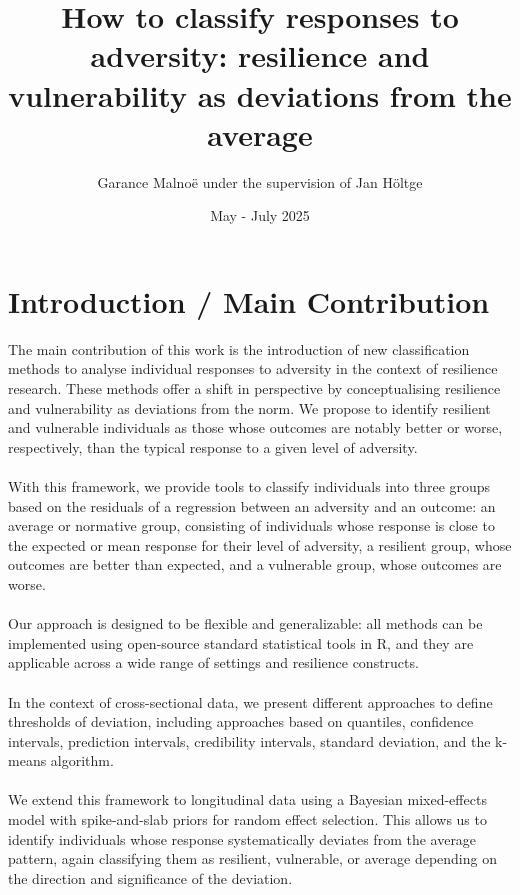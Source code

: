 \documentclass[12pt]{article}
\begin{document}
\title{How to classify responses to adversity: resilience and vulnerability as deviations from the average}
\author{Garance Malnoë under the supervision of Jan Höltge}
\date{May - July 2025}

\maketitle
\tableofcontents
\clearpage
{}
\section{Introduction / Main Contribution}

The main contribution of this work is the introduction of new classification methods to analyse individual responses to adversity in the context of resilience research. These methods offer a shift in perspective by conceptualising resilience and vulnerability as deviations from the norm. We propose to identify resilient and vulnerable individuals as those whose outcomes are notably better or worse, respectively, than the typical response to a given level of adversity.\\
\\
With this framework, we provide tools to classify individuals into three groups based on the residuals of a regression between an adversity and an outcome: an average or normative group, consisting of individuals whose response is close to the expected or mean response for their level of adversity, a resilient group, whose outcomes are better than expected, and a vulnerable group, whose outcomes are worse.\\
\\
Our approach is designed to be flexible and generalizable: all methods can be implemented using open-source standard statistical tools in R, and they are applicable across a wide range of settings and resilience constructs.\\
\\
In the context of cross-sectional data, we present different approaches to define thresholds of deviation, including approaches based on quantiles, confidence intervals, prediction intervals, credibility intervals, standard deviation, and the k-means algorithm.\\
\\
We extend this framework to longitudinal data using a Bayesian mixed-effects model with spike-and-slab priors for random effect selection. This allows us to identify individuals whose response systematically deviates from the average pattern, again classifying them as resilient, vulnerable, or average depending on the direction and significance of the deviation.\\
\end{document}
